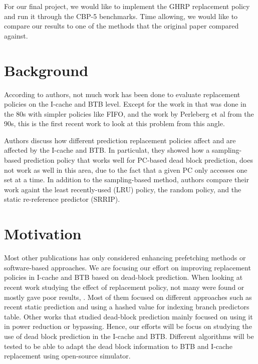 \documentclass[11pt]{article}
\begin{document}
For our final project, we would like to implement the GHRP replacement policy and run it through the CBP-5 benchmarks. Time allowing, we would like to compare our 
results to one of the methods that the original paper compared against.

\section{Background}
\label{sec:background}

According to authors, not much work has been done to evaluate replacement policies on the I-cache and BTB level. Except for the work in \cite{smith-1985} that was done in the 80s
with simpler policies like FIFO, and the work by Perleberg et al \cite{perleberg-1993} from the 90s, this is the first recent work to look at this problem from this angle.

Authors discuss how different prediction replacement policies affect and are affected by the I-cache and BTB. In particulat, they showed how a sampling-based
prediction policy that works well for PC-based dead block prediction, does not work as well in this area, due to the fact that a given PC only accesses one set at a time.
In addition to the sampling-based method, authors compare their work againt the least recently-used (LRU) policy, the random policy, and the static re-reference predictor (SRRIP).

\section{Motivation}
\label{sec:motivation}

Most other publications has only considered enhancing prefetching methods or software-based approaches. We are focusing our 
effort on improving replacement policies in I-cache and BTB based on dead-block prediction. When looking at recent work studying 
the effect of replacement policy, not many were found or mostly gave poor results, . Most of them focused on different approaches 
such as recent static prediction and using a hashed value for indexing branch predictors table. Other works that studied dead-block 
prediction mainly focused on using it in power reduction or bypassing. Hence, our efforts will be focus on studying the use of dead block prediction
in the I-cache and BTB. Different algorithms will be tested to be able to adapt the dead block information to BTB and I-cache replacement using open-source simulator.  
\end{document}
